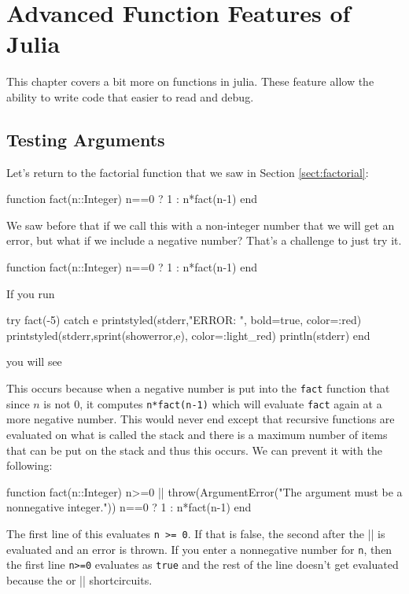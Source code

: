 
\chapter{Advanced Function Features of Julia} \label{ch:adv-functions}

This chapter covers a bit more on functions in julia.  These feature allow the ability to write code that easier to read and debug.  

\section{Testing Arguments}

Let's return to the factorial function that we saw in Section  \ref{sect:factorial}: 
%
\begin{jlblock}[adf]
function fact(n::Integer)
  n==0 ? 1 : n*fact(n-1)
end
\end{jlblock}
%
We saw before that if we call this with a non-integer number that we will get an error, but what if we include a negative number?  That's a challenge to just try it.

\begin{jlcode}
function fact(n::Integer)
  n==0 ? 1 : n*fact(n-1)
end
\end{jlcode}

If you run 
\begin{jlcode}
try
  fact(-5)
catch e
  printstyled(stderr,"ERROR: ", bold=true, color=:red)
  printstyled(stderr,sprint(showerror,e), color=:light_red)
  println(stderr)
end
\end{jlcode}
you will see \stderrpythontex[verbatim]

This occurs because when a negative number is put into the \verb!fact! function that since $n$ is not 0, it computes \verb!n*fact(n-1)! which will evaluate \verb!fact! again at a more negative number.  This would never end except that recursive functions are evaluated on what is called the stack and there is a maximum number of items that can be put on the stack and thus this occurs.  We can prevent it with the following:
%

\begin{jlblock}[adf]
function fact(n::Integer)
  n>=0 || throw(ArgumentError("The argument must be a nonnegative integer."))
  n==0 ? 1 : n*fact(n-1)
end
\end{jlblock}


The first line of this evaluates \verb!n >= 0!.  If that is false, the second after the || is evaluated and an error is thrown.  If you enter a nonnegative number for \texttt{n}, then the first line \verb!n>=0! evaluates as \verb!true! and the rest of the line doesn't get evaluated because the or || shortcircuits. 


